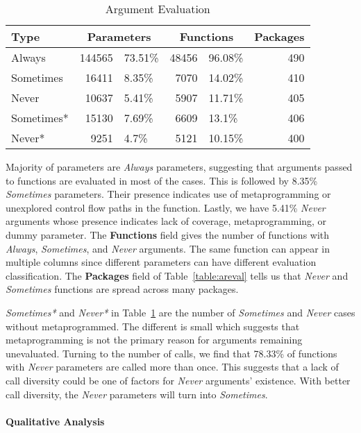 \documentclass[review,nonacm,screen,acmsmall,anonymous=true]{acmart}
\newcommand{\always}{\emph{Always}\xspace}
\newcommand{\sometimes}{\emph{Sometimes}\xspace}
\newcommand{\sometimesStar}{\emph{Sometimes*}\xspace}
\newcommand{\never}{\emph{Never}\xspace}
\newcommand{\neverStar}{\emph{Never*}\xspace}
\begin{document}
\begin{table}[!h]
  \vspace{-3mm}
  \caption{Argument Evaluation}\label{table:argeval}
  \vspace{-3mm}
  \begin{tabular}{lr|lr|lr}
    \toprule
    \textbf{Type}&\multicolumn{2}{c}{\textbf{Parameters}}&\multicolumn{2}{c}{\textbf{Functions}}&\textbf{Packages}\\
    \midrule
    Always&144565&73.51\%&48456&96.08\%&490\\
    Sometimes&16411&8.35\%&7070&14.02\%&410\\
    Never&10637&5.41\%&5907&11.71\%&405\\
    \midrule
    Sometimes*&15130&7.69\%&6609&13.1\%&406\\
    Never*&9251&4.7\%&5121&10.15\%&400\\
    \bottomrule
  \end{tabular}
\end{table}

Majority of parameters are \always parameters, suggesting that arguments passed
to functions are evaluated in most of the cases. This is followed by 8.35\%
\sometimes parameters. Their presence indicates use of metaprogramming or
unexplored control flow paths in the function. Lastly, we have 5.41\% \never
arguments whose presence indicates lack of coverage, metaprogramming, or dummy
parameter. The \textbf{Functions} field gives the number of functions with
\always, \sometimes, and \never arguments. The same function can appear in
multiple columns since different parameters can have different evaluation
classification. The \textbf{Packages} field of Table~\ref{table:areval} tells us
that \never and \sometimes functions are spread across many packages.


\sometimesStar and \neverStar in Table~\ref{table:argeval} are the number of
\sometimes and \never cases without metaprogrammed. The different is small which
suggests that metaprogramming is not the primary reason for arguments remaining
unevaluated. Turning to the number of calls, we find that 78.33\% of functions
with \never parameters are called more than once. This suggests that a lack of
call diversity could be one of factors for \never arguments' existence. With
better call diversity, the \never parameters will turn into \sometimes.

\paragraph{Qualitative Analysis}
\end{document}
